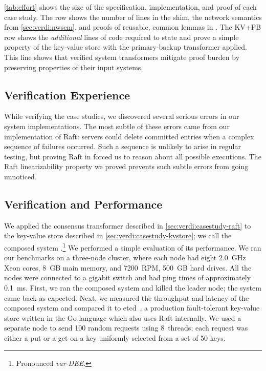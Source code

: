 \cref{tab:effort} shows the size of the
specification, implementation, and proof of each case study.
The \Verdi row shows
the number of lines in the shim,
the network semantics from \cref{sec:verdi:nwsem},
and proofs of reusable, common lemmas in \Verdi. The KV+PB row shows
the \textit{additional} lines of code required to state and prove a
simple property of the key-value store with the primary-backup
transformer applied. This line shows that verified system transformers
mitigate proof burden by preserving properties of their input systems.

\subsection{Verification Experience}

While verifying the case studies, we discovered several serious errors in
our system implementations.  The most subtle of these errors came from our
implementation of Raft: servers could delete committed entries when a
complex sequence of failures occurred. Such a sequence is unlikely to arise
in regular testing, but proving Raft in \Verdi forced us to reason about
all possible executions. The Raft linearizability property we proved
prevents such subtle errors from going unnoticed.

\subsection{Verification and Performance}

We applied the consensus transformer described in
\cref{sec:verdi:casestudy-raft} to the key-value store described in
\cref{sec:verdi:casestudy-kvstore}; we call the composed system
\vard.\footnote{Pronounced \emph{var-DEE}.} We performed a simple
evaluation of its performance.
%
We ran our benchmarks on a three-node cluster, where each node had
eight 2.0~GHz Xeon cores, 8~GB main memory, and 7200~RPM, 500~GB hard
drives.  All the nodes were connected to a gigabit switch and had ping
times of approximately 0.1~ms.
%
First, we ran the composed system and killed the leader node;
the system came back as expected.
%
Next, we measured the throughput and latency of the composed
system and compared it to etcd~\cite{etcd}, a production
fault-tolerant key-value store written in the Go language which also
uses Raft internally.
%
We used a
separate node to send 100 random requests using 8~threads; each
request was either a put or a get on a key uniformly selected from a
set of 50 keys.

